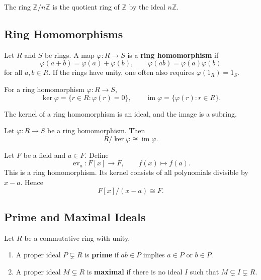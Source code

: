 \begin{example}
The ring $\mathbb{Z}/n\mathbb{Z}$ is the quotient ring of $\mathbb{Z}$ by the ideal $n\mathbb{Z}$.
\end{example}

\subsection{Ring Homomorphisms}

\begin{definition}
Let $R$ and $S$ be rings. A map $\varphi:R\to S$ is a \textbf{ring homomorphism} if
\[
    \varphi(a+b)=\varphi(a)+\varphi(b),
    \qquad
    \varphi(ab)=\varphi(a)\varphi(b)
\]
for all $a,b\in R$. If the rings have unity, one often also requires $\varphi(1_R)=1_S$.
\end{definition}

\begin{definition}
For a ring homomorphism $\varphi:R\to S$,
\[
    \ker\varphi=\{r\in R:\varphi(r)=0\},
    \qquad
    \operatorname{im}\varphi=\{\varphi(r):r\in R\}.
\]
\end{definition}

\begin{proposition}
The kernel of a ring homomorphism is an ideal, and the image is a subring.
\end{proposition}

\begin{theorem}
Let $\varphi:R\to S$ be a ring homomorphism. Then
\[
    R/\ker\varphi\cong \operatorname{im}\varphi.
\]
\end{theorem}

\newpage

\begin{example}
Let $F$ be a field and $a\in F$. Define
\[
    \operatorname{ev}_a:F[x]\to F,
    \qquad
    f(x)\mapsto f(a).
\]
This is a ring homomorphism. Its kernel consists of all polynomials divisible by $x-a$. Hence
\[
    F[x]/(x-a)\cong F.
\]
\end{example}

\subsection{Prime and Maximal Ideals}

\begin{definition}
Let $R$ be a commutative ring with unity.
\begin{enumerate}
    \item A proper ideal $P\subsetneq R$ is \textbf{prime} if $ab\in P$ implies $a\in P$ or $b\in P$.
    \item A proper ideal $M\subsetneq R$ is \textbf{maximal} if there is no ideal $I$ such that $M\subsetneq I\subsetneq R$.
\end{enumerate}
\end{definition}

